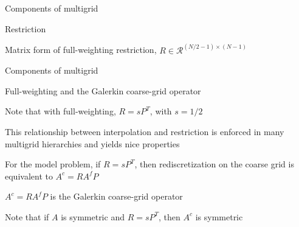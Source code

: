 \documentclass[18pt,xcolor=table]{beamer}
\begin{document}
\begin{frame}{Components of multigrid}
\begin{block}{Restriction}
\bit
\item Matrix form of full-weighting restriction, $R\in\mathcal{R}^{(N/2-1)\times(N-1)}$
\eit
{}
\end{block}
\end{frame}

\begin{frame}{Components of multigrid}
\begin{block}{Full-weighting and the Galerkin coarse-grid operator}
\bit
\item Note that with full-weighting, $R = sP^T$, with $s = 1/2$
\item This relationship between interpolation and restriction is enforced in many multigrid hierarchies and yields nice properties
\item For the model problem, if $R = sP^T$, then rediscretization on the coarse grid is equivalent to $A^c = RA^fP$
\item $A^c = RA^fP$ is the Galerkin coarse-grid operator
\item Note that if $A$ is symmetric and $R = sP^T$, then $A^c$ is symmetric
\eit
\end{block}
\end{frame}
\end{document}
